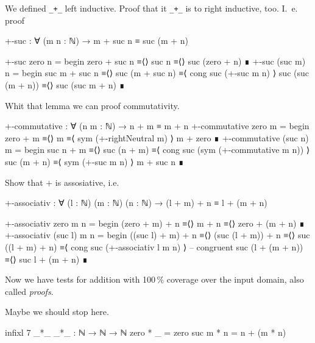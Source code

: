 \begin{exercise}
We defined \verb=_+_= left inductive. Proof that it \verb=_+_= is to right inductive, too.
I. e. proof

\begin{code}
+-suc : ∀ (m n : ℕ) → m + suc n ≡ suc (m + n)
\end{code}
\end{exercise}

\begin{code}
+-suc zero n =
  begin
    zero + suc n
  ≡⟨⟩
    suc n
  ≡⟨⟩
    suc (zero + n)
  ∎
+-suc (suc m) n =
  begin
    suc m + suc n
  ≡⟨⟩
    suc (m + suc n)
  ≡⟨ cong suc (+-suc m n) ⟩
    suc (suc (m + n))
  ≡⟨⟩
    suc (suc m + n)
  ∎
\end{code}

Whit that lemma we can proof commutativity.
\begin{code}
+-commutative : ∀ (n m : ℕ) → n + m ≡ m + n
+-commutative zero m =
  begin
    zero + m
  ≡⟨⟩
    m
  ≡⟨ sym (+-rightNeutral m) ⟩
    m + zero
  ∎
+-commutative (suc n) m =
  begin
    suc n + m
  ≡⟨⟩
    suc (n + m)
  ≡⟨ cong suc (sym (+-commutative m n)) ⟩
    suc (m + n)
  ≡⟨ sym (+-suc m n) ⟩
    m + suc n
  ∎
\end{code}

\begin{exercise}
Show that $+$ is assosiative, i.e.

\begin{code}
+-associativ : ∀ (l : ℕ) (m : ℕ) (n : ℕ)
  → (l + m) + n ≡ l + (m + n)
\end{code}
\end{exercise}

\begin{code}
+-associativ zero m n =
  begin
    (zero + m) + n
  ≡⟨⟩
    m + n
  ≡⟨⟩
    zero + (m + n)
  ∎
+-associativ (suc l) m n =
  begin
    ((suc l) + m) + n
  ≡⟨⟩
    (suc (l + m)) + n
  ≡⟨⟩
    suc ((l + m) + n)
  ≡⟨ cong suc (+-associativ l m n) ⟩ -- congruent
    suc (l + (m + n))
  ≡⟨⟩
   suc l + (m + n)
  ∎
\end{code}

Now we have tests for addition with 100\,\% coverage over the input domain,
also called \emph{proofs}.

Maybe we should stop here.

\begin{code}
infixl 7 _*_
_*_ : ℕ → ℕ → ℕ
zero * _ = zero
suc m * n = n + (m * n)
\end{code}

